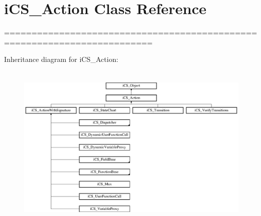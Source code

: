 \hypertarget{classi_c_s___action}{\section{i\+C\+S\+\_\+\+Action Class Reference}
\label{classi_c_s___action}
}


=========================================================================  


Inheritance diagram for i\+C\+S\+\_\+\+Action\+:\begin{figure}[H]
\begin{center}
\leavevmode
\includegraphics[height=7.979275cm]{classi_c_s___action}
\end{center}
\end{figure}
